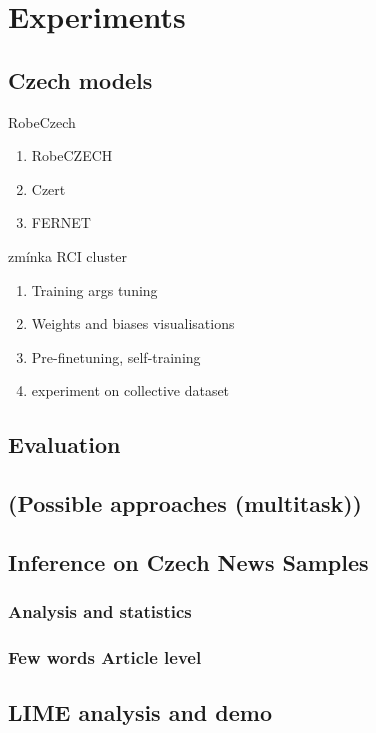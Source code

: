 \chapter{Experiments}

\section{Czech models}
RobeCzech \cite{thorne2019fever2}
\begin{enumerate}
    \item RobeCZECH
    \item Czert
    \item FERNET
\end{enumerate}
zmínka RCI cluster
\begin{enumerate}
    \item Training args tuning
    \item Weights and biases visualisations
    \item Pre-finetuning, self-training
    \item experiment on collective dataset
\end{enumerate}

\section{Evaluation}
\section{(Possible approaches (multitask))}
\section{Inference on Czech News Samples}
\subsection{Analysis and statistics}
\subsection{Few words Article level}

\section{LIME analysis and demo}